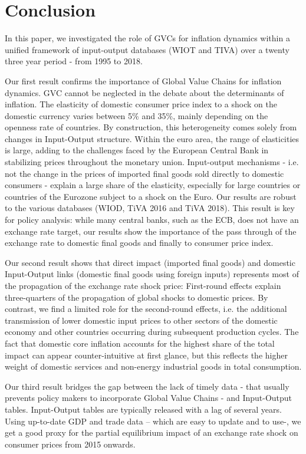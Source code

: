 \documentclass[11pt,a4paper]{article}
\begin{document}
\section{Conclusion}
\label{sec:ccl}

In this paper, we investigated the role of GVCs for inflation dynamics within a unified framework of input-output databases (WIOT and TIVA) over a twenty three year period - from 1995 to 2018.  

Our first result confirms the importance of Global Value Chains for inflation dynamics.
GVC cannot be neglected in the debate about the determinants of inflation.
The elasticity of domestic consumer price index to a shock on the domestic currency varies between 5\% and 35\%, mainly depending on the openness rate of countries.
By construction, this heterogeneity comes solely from changes in Input-Output structure.
Within the euro area, the range of elasticities is large, adding to the challenges faced by the European Central Bank in stabilizing prices throughout the monetary union.
Input-output mechanisms - i.e. not the change in the prices of imported final goods sold directly to domestic consumers - explain a large share of the elasticity, especially for large countries or countries of the Eurozone subject to a shock on the Euro.
Our results are robust to the various databases (WIOD, TiVA 2016 and TiVA 2018).
This result is key for policy analysis: while many central banks, such as the ECB, does not have an exchange rate target, our results show the importance of the pass through of the exchange rate to domestic final goods and finally to consumer price index. 

Our second result shows that direct impact (imported final goods) and domestic Input-Output links (domestic final goods using foreign inputs) represents most of the propagation of the exchange rate shock price: First-round effects explain three-quarters of the propagation of global shocks to domestic prices.
By contrast, we find a limited role for the second-round effects, i.e. the additional transmission of lower domestic input prices to other sectors of the domestic economy and other countries occurring during subsequent production cycles.
The fact that domestic core inflation accounts for the highest share of the total impact can appear counter-intuitive at first glance, but this reflects the higher weight of domestic services and non-energy industrial goods in total consumption.

Our third result bridges the gap between the lack of timely data - that usually prevents policy makers to incorporate Global Value Chains - and Input-Output tables.
Input-Output tables are typically released with a lag of several years.
Using up-to-date GDP and trade data – which are easy to update and to use-, we get a good proxy for the partial equilibrium impact of an exchange rate shock on consumer prices from 2015 onwards. 
\end{document}
